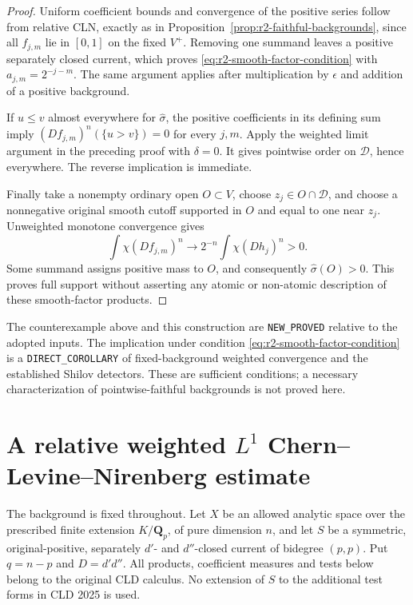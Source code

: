 \documentclass[11pt,a4paper]{article}
\numberwithin{equation}{section}
\theoremstyle{definition}
\theoremstyle{remark}
\begin{document}
\begin{proof}
Uniform coefficient bounds and convergence of the positive series
follow from relative CLN, exactly as in
Proposition~\ref{prop:r2-faithful-backgrounds}, since all $f_{j,m}$
lie in $[0,1]$ on the fixed $V^+$. Removing one summand leaves a
positive separately closed current, which proves
\eqref{eq:r2-smooth-factor-condition} with $a_{j,m}=2^{-j-m}$.
The same argument applies after multiplication by $\epsilon$ and
addition of a positive background.

If $u\leq v$ almost everywhere for $\widehat\sigma$, the positive
coefficients in its defining sum imply
$(Df_{j,m})^n(\{u>v\})=0$ for every $j,m$. Apply the weighted limit
argument in the preceding proof with $\delta=0$. It gives pointwise
order on $\mathscr D$, hence everywhere. The reverse implication is
immediate.

Finally take a nonempty ordinary open $O\subset V$, choose
$z_j\in O\cap\mathscr D$, and choose a nonnegative original smooth
cutoff supported in $O$ and equal to one near $z_j$. Unweighted
monotone convergence gives
\[
 \int\chi(Df_{j,m})^n
     \longrightarrow 2^{-n}\int\chi(Dh_j)^n>0.
\]
Some summand assigns positive mass to $O$, and consequently
$\widehat\sigma(O)>0$. This proves full support without asserting
any atomic or non-atomic description of these smooth-factor products.
\end{proof}

The counterexample above and this construction are
\texttt{NEW\_PROVED} relative to the adopted inputs. The implication
under condition \eqref{eq:r2-smooth-factor-condition} is a
\texttt{DIRECT\_COROLLARY} of fixed-background weighted convergence
and the established Shilov detectors. These are sufficient conditions;
a necessary characterization of pointwise-faithful backgrounds is
not proved here.



\section{A relative weighted $L^1$ Chern--Levine--Nirenberg estimate}
\label{sec:r2-weighted-l1}

The background is fixed throughout. Let $X$ be an allowed analytic
space over the prescribed finite extension $K/\mathbf Q_p$, of pure
dimension $n$, and let $S$ be a symmetric, original-positive,
separately $d'$- and $d''$-closed current of bidegree $(p,p)$.
Put $q=n-p$ and $D=d'd''$. All products, coefficient measures and
tests below belong to the original CLD calculus. No extension of $S$
to the additional test forms in CLD 2025 is used.
\end{document}
